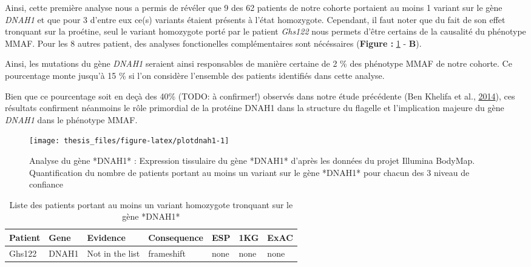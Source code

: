 \documentclass[12pt,twoside]{reedthesis}
\theoremstyle{definition}
\theoremstyle{definition}
\theoremstyle{remark}
\begin{document}
  Ainsi, cette première analyse nous a permis de révéler que 9 des 62
  patients de notre cohorte portaient au moins 1 variant sur le gène
  \emph{DNAH1} et que pour 3 d'entre eux ce(s) variants étaient présents à
  l'état homozygote. Cependant, il faut noter que du fait de son effet
  tronquant sur la proétine, seul le variant homozygote porté par le
  patient \emph{Ghs122} nous permets d'être certains de la causalité du
  phénotype MMAF. Pour les 8 autres patient, des analyses fonctionelles
  complémentaires sont nécéssaires (\textbf{Figure : }\ref{fig:plotdnah1}
  - \textbf{B}).
  
  Ainsi, les mutations du gène \emph{DNAH1} seraient ainsi responsables de
  manière certaine de 2 \% des phénotype MMAF de notre cohorte. Ce
  pourcentage monte jusqu'à 15 \% si l'on considère l'ensemble des
  patients identifiés dans cette analyse.
  
  Bien que ce pourcentage soit en deçà des 40\% (TODO: à confirmer!)
  observés dans notre étude précédente (Ben Khelifa et al.,
  \protect\hyperlink{ref-BenKhelifa2014}{2014}), ces résultats confirment
  néanmoins le rôle primordial de la protéine DNAH1 dans la structure du
  flagelle et l'implication majeure du gène \emph{DNAH1} dans le phénotype
  MMAF.
  
  \newpage
  
  \begin{figure}
  
  {\centering \texttt{[image: thesis\_files/figure-latex/plotdnah1-1]} 
  
  }
  
  \caption[Analyse du gène *DNAH1*]{Analyse du gène *DNAH1* : Expression tissulaire du gène *DNAH1* d'après les données du projet Illumina BodyMap. Quantification du nombre de patients portant au moins un variant sur le gène *DNAH1* pour chacun des 3 niveau de confiance}\label{fig:plotdnah1}
  \end{figure}
  
  \newpage
  
  \begin{longtable}[t]{lllllll}
  \caption{\label{tab:tabdnah1high}Liste des patients portant au moins un variant homozygote tronquant sur le gène *DNAH1*}\\
  \toprule
  Patient & Gene & Evidence & Consequence & ESP & 1KG & ExAC\\
  \midrule
  Ghs122 & DNAH1 & Not in the list & frameshift & none & none & none\\
  \bottomrule
  \end{longtable}
  
\end{document}
